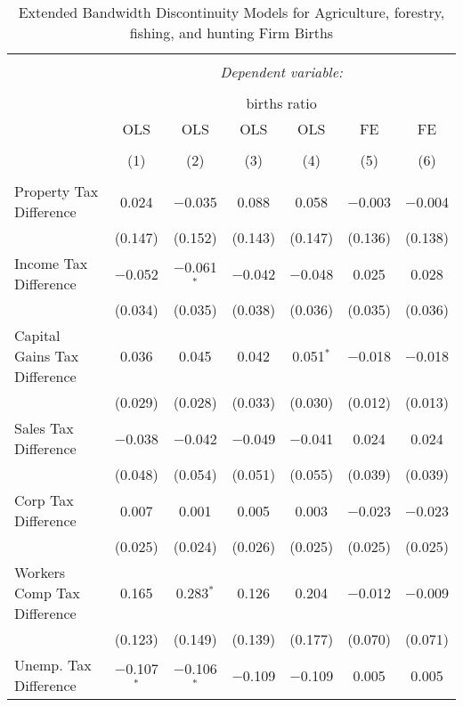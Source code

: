 
\begin{table}[!htbp] \centering 
  \caption{Extended Bandwidth Discontinuity Models for  Agriculture, forestry, fishing, and hunting Firm Births} 
  \label{11eb} 
\begin{tabular}{@{\extracolsep{5pt}}lcccccc} 
\\[-1.8ex]\hline 
\hline \\[-1.8ex] 
 & \multicolumn{6}{c}{\textit{Dependent variable:}} \\ 
\cline{2-7} 
\\[-1.8ex] & \multicolumn{6}{c}{births ratio} \\ 
 & OLS & OLS & OLS & OLS & FE & FE \\ 
\\[-1.8ex] & (1) & (2) & (3) & (4) & (5) & (6)\\ 
\hline \\[-1.8ex] 
 Property Tax Difference & 0.024 & $-$0.035 & 0.088 & 0.058 & $-$0.003 & $-$0.004 \\ 
  & (0.147) & (0.152) & (0.143) & (0.147) & (0.136) & (0.138) \\ 
  Income Tax Difference & $-$0.052 & $-$0.061$^{*}$ & $-$0.042 & $-$0.048 & 0.025 & 0.028 \\ 
  & (0.034) & (0.035) & (0.038) & (0.036) & (0.035) & (0.036) \\ 
  Capital Gains Tax Difference & 0.036 & 0.045 & 0.042 & 0.051$^{*}$ & $-$0.018 & $-$0.018 \\ 
  & (0.029) & (0.028) & (0.033) & (0.030) & (0.012) & (0.013) \\ 
  Sales Tax Difference & $-$0.038 & $-$0.042 & $-$0.049 & $-$0.041 & 0.024 & 0.024 \\ 
  & (0.048) & (0.054) & (0.051) & (0.055) & (0.039) & (0.039) \\ 
  Corp Tax Difference & 0.007 & 0.001 & 0.005 & 0.003 & $-$0.023 & $-$0.023 \\ 
  & (0.025) & (0.024) & (0.026) & (0.025) & (0.025) & (0.025) \\ 
  Workers Comp Tax Difference & 0.165 & 0.283$^{*}$ & 0.126 & 0.204 & $-$0.012 & $-$0.009 \\ 
  & (0.123) & (0.149) & (0.139) & (0.177) & (0.070) & (0.071) \\ 
  Unemp. Tax Difference & $-$0.107$^{*}$ & $-$0.106$^{*}$ & $-$0.109 & $-$0.109 & 0.005 & 0.005 \\ 

\end{tabular}
\end{table}
